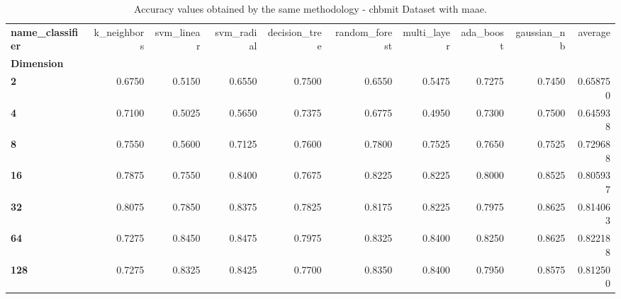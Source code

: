 \begin{table}
\centering
\caption{Accuracy values obtained by the same methodology - chbmit Dataset with maae.}
\label{accuracy_chbmit_maae-reproduction}
\begin{tabular}{lrrrrrrrrr}
\toprule
\textbf{name\_classifier} &  k\_neighbors &  svm\_linear &  svm\_radial &  decision\_tree &  random\_forest &  multi\_layer &  ada\_boost &  gaussian\_nb &   average \\
\textbf{Dimension} &              &             &             &                &                &              &            &              &           \\
\midrule
\textbf{2        } &       0.6750 &      0.5150 &      0.6550 &         0.7500 &         0.6550 &       0.5475 &     0.7275 &       0.7450 &  0.658750 \\
\textbf{4        } &       0.7100 &      0.5025 &      0.5650 &         0.7375 &         0.6775 &       0.4950 &     0.7300 &       0.7500 &  0.645938 \\
\textbf{8        } &       0.7550 &      0.5600 &      0.7125 &         0.7600 &         0.7800 &       0.7525 &     0.7650 &       0.7525 &  0.729688 \\
\textbf{16       } &       0.7875 &      0.7550 &      0.8400 &         0.7675 &         0.8225 &       0.8225 &     0.8000 &       0.8525 &  0.805937 \\
\textbf{32       } &       0.8075 &      0.7850 &      0.8375 &         0.7825 &         0.8175 &       0.8225 &     0.7975 &       0.8625 &  0.814063 \\
\textbf{64       } &       0.7275 &      0.8450 &      0.8475 &         0.7975 &         0.8325 &       0.8400 &     0.8250 &       0.8625 &  0.822188 \\
\textbf{128      } &       0.7275 &      0.8325 &      0.8425 &         0.7700 &         0.8350 &       0.8400 &     0.7950 &       0.8575 &  0.812500 \\
\bottomrule
\end{tabular}
\end{table}
